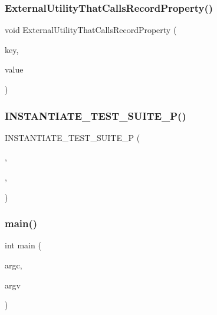 \subsubsection{\texorpdfstring{ExternalUtilityThatCallsRecordProperty()}{ExternalUtilityThatCallsRecordProperty()}\hspace{0.1cm}{\footnotesize\ttfamily [2/2]}}
{\footnotesize\ttfamily void External\+Utility\+That\+Calls\+Record\+Property (\begin{DoxyParamCaption}\item[{const std\+::string \&}]{key,  }\item[{const std\+::string \&}]{value }\end{DoxyParamCaption})}

\mbox{\label{googletest-master_2googletest_2test_2gtest__xml__output__unittest___8cc_a1dca731adef470af2e5e1e2fa3b5df68}} 
\subsubsection{\texorpdfstring{INSTANTIATE\_TEST\_SUITE\_P()}{INSTANTIATE\_TEST\_SUITE\_P()}}
{\footnotesize\ttfamily I\+N\+S\+T\+A\+N\+T\+I\+A\+T\+E\+\_\+\+T\+E\+S\+T\+\_\+\+S\+U\+I\+T\+E\+\_\+P (\begin{DoxyParamCaption}\item[{Single}]{,  }\item[{\mbox{\hyperlink{class_value_param_test}{Value\+Param\+Test}}}]{,  }\item[{Values(33, 42)}]{ }\end{DoxyParamCaption})}

\mbox{\label{googletest-master_2googletest_2test_2gtest__xml__output__unittest___8cc_a3c04138a5bfe5d72780bb7e82a18e627}} 
\subsubsection{\texorpdfstring{main()}{main()}}
{\footnotesize\ttfamily int main (\begin{DoxyParamCaption}\item[{int}]{argc,  }\item[{char $\ast$$\ast$}]{argv }\end{DoxyParamCaption})}

